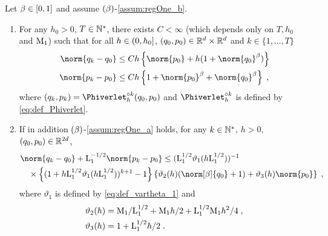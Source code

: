  \begin{lemma}
  \label{lem:bound_first_iterate_leapfrog_b}
Let $\beta \in \left[0,1\right]$ and assume $(\beta)$-\ref{assum:regOne_b}.
  \begin{enumerate}[label=(\roman*)]
\item
\label{lem:bound_first_iterate_leapfrog_1}
For any $h_0 >0$, $T \in \mathbb{N}^{*}$, there exists $C < \infty$ (which depends only on $T,h_0$
 and $\mathrm{M}_1$) such that for all $h \in \left(0,h_0\right]$,
  $(q_0,p_0) \in \mathbb{R}^d \times \mathbb{R}^d$ and $k \in \{1,\ldots, T\}$
  \begin{align}
\label{lem:bound_first_iterate_leapfrog_1_q}
    \norm{\q_k-\q_0} &\leq C h\defEns{  \norm{\p_0} +h(1+ \norm{\q_0}^{\expozero})}\\
\label{lem:bound_first_iterate_leapfrog_1_p}
    \norm{\p_k-\p_0}& \leq C h\defEns{  1+ \norm{\p_0}^{\expozero}+ \norm{\q_0}^{\expozero}} \eqsp,
  \end{align}
where $(\q_k,\p_k) = \Phiverlet^{\circ k}_{h}(\q_0,\p_0)$ and  $\Phiverlet^{\circ k}_{h}$ is defined by \eqref{eq:def_Phiverlet}.
\item \label{lem:bound_first_iterate_leapfrog_b_2}
  If in addition $(\beta)$-\ref{assum:regOne_a} holds, for any $k \in \mathbb{N}^{*}$, $h >0$, $(q_0,p_0) \in \mathbb{R}^{2d}$,
  \begin{align}
    &    \norm{q_k-q_0} + \constzero^{-1/2}\norm{p_k - p_0} \leq (\constzero^{1/2}\vartheta_1(h \constzero^{1/2}))^{-1} \\
    & \quad \times \defEns{(1+h \constzero^{1/2}\vartheta_1(h \constzero^{1/2}))^{k+1} - 1} \defEns{\vartheta_2(h) (\norm[\beta]{q_0} +1) + \vartheta_3(h) \norm{p_0}} \eqsp,
  \end{align}
  where $\vartheta_1$ is defined by \eqref{eq:def_vartheta_1} and
  \begin{align}
  \label{eq:definition-vartheta-2}
    \vartheta_2(h) &= \mathrm{M}_1/\mathrm{L}_1^{1/2} + \mathrm{M}_1 h/2 + \mathrm{L}_1^{1/2}\mathrm{M}_1 h^2/4 \;, \\
  \label{eq:definition-vartheta-3}
    \vartheta_3(h) &= 1+\mathrm{L}_1^{1/2} h /2 \;.
  \end{align}
  \end{enumerate}
\end{lemma}
